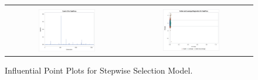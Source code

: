 \documentclass[11pt]{scrartcl} %
\begin{document}
\begin{figure}[H] %
	\centering
	\begin{tabular}{p{} p{}}
\hline	
	\multicolumn{1}{|c}{} &  \multicolumn{1}{c|}{} \\
		\multicolumn{1}{|c}{\includegraphics[width=0.48\textwidth]{../graphics/A2SWcooks}} &
		\multicolumn{1}{c|}{\includegraphics[width=0.48\textwidth]{../graphics/A2SWlev}}\\
		\hline
	\end{tabular}		
	\caption{Influential Point Plots for Stepwise Selection Model.}
	\label{fig:A2SWIP}
\end{figure}

\pagebreak
\end{document}
